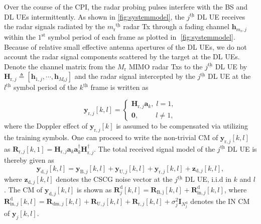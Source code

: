 \documentclass[9pt,journal]{IEEEtran}
\newcommand{\bracket}[1]{{\left [{#1}\right ]}}
\newcommand{\ith}[1]    {{#1}^{\underline{\text{th}}}}
\newcommand{\rr}{_\mathrm{r}}
\begin{document}
Over the course of the CPI, the radar probing pulses interfere with the BS and DL UEs intermittently. As shown in \figurename{\;\ref{fig:systemmodel}}, the $\ith{j}$ DL UE receives the radar signals radiated by the $\ith{m\rr}$ radar Tx through a fading channel $\mathbf{h}_{m\rr, j}$ within the $1^{\mathrm{st}}$ symbol period of each frame as plotted in \figurename{$\;$\ref{fig:systemmodel}}. Because of relative small effective antenna apertures of the DL UEs, we do not account the radar signal components scattered by the target at the DL UEs. Denote the channel matrix from the $\mathit{M}\rr$ MIMO radar Txs to the $\ith{j}$ DL UE by $\mathbf{H}_{\mathrm{r},j}\triangleq\bracket{\mathbf{h}_{\mathrm{1},j},\cdots,\mathbf{h}_{\mathit{M}\rr j}}$ and the radar signal intercepted by the $\ith{j}$ DL UE at the $\ith{l}$ symbol period of the $\ith{k}$ frame is written as \par\noindent\small
\begin{equation*}
    \mathbf{y}_{\mathrm{r},j}\bracket{k,l}=
    \begin{cases}
    \mathbf{H}_{\mathrm{r},j}\mathbf{a}_k, \;l=1,\\
    \mathbf{0}, \qquad~~ l\neq1,
    \end{cases}
\end{equation*}
\normalsize
where the Doppler effect of $\mathbf{y}_{\mathrm{r},j}\bracket{k}$ is assumed to be compensated via utilizing the training symbols\cite{MCMIMO_RadComm}. One can proceed to write the non-trivial CM of $\mathbf{y}_{\mathrm{r},j}\bracket{k,l}$ as $\mathbf{R}_{\mathrm{r},j}\bracket{k,1}=\mathbf{H}_{\mathrm{r},j}\mathbf{a}_k\mathbf{a}^\dagger_k\mathbf{H}^\dagger_{\mathrm{r},j}$. The total received signal model of the $\ith{j}$ DL UE is thereby given as 
\begin{equation}
\mathbf{y}_{\textrm{d},j}\bracket{k,l}=\mathbf{y}_{\textrm{B},j}\bracket{k,l}+\mathbf{y}_{\mathrm{U},j}\bracket{k,l}+\mathbf{y}_{\mathrm{r},j}\bracket{k,l}+\mathbf{z}_{\textrm{d},j}\bracket{k,l},
\end{equation}
where $\mathbf{z}_{\textrm{d},j}\bracket{k,l}$ denotes the CSCG noise vector at the $\ith{j}$ DL UE, i.i.d in $k$ and $l$. The CM of $\mathbf{y}_{\textrm{d},j}\bracket{k,l}$ is shown as $\mathbf{R}^\mathrm{d}_j\bracket{k,l}=\mathbf{R}_{\mathrm{B,j}}\bracket{k,l}+\mathbf{R}^\mathrm{d}_{\mathrm{in,}j}\bracket{k,l}$, where $	\mathbf{R}^\textrm{d}_{\mathrm{in},j}\bracket{k,l}=\mathbf{R}_{\mathrm{dm},j}\bracket{k,l}+\mathbf{R}_{\mathrm{U,}j}\bracket{k,l}+\mathbf{R}_{\mathrm{r},j}\bracket{k,l}+\sigma^2_j\mathbf{I}_{\mathit{N}^{\textrm{d}}_j}$ denotes the IN CM of $\mathbf{y}_{j}\bracket{k,l}$.   %
\end{document}
